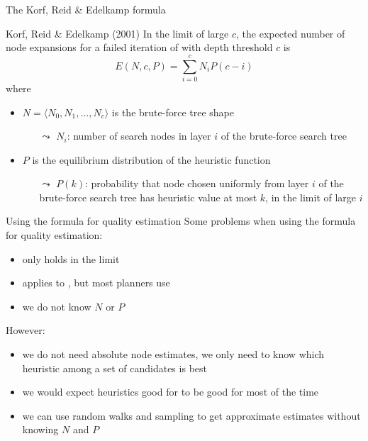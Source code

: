 \documentclass{gkibeamer}
\begin{document}
\begin{frame}{The Korf, Reid \& Edelkamp formula}
  \begin{block}{Korf, Reid \& Edelkamp (2001)}
    In the limit of large $c$, the expected number of node expansions
    for a failed iteration of {\idastar} with depth threshold $c$ is
    \[ E(N, c, P) = \sum_{i=0}^c N_i P(c - i) \]
    where
    \begin{itemize}
    \item $N = \langle N_0, N_1, \dots, N_c\rangle$ is the
      \alert{brute-force tree shape}
      \begin{itemize}
      \item[$\leadsto$] $N_i$: number of search nodes in layer $i$ of
        the brute-force search tree
      \end{itemize}
    \item $P$ is the \alert{equilibrium distribution} of the heuristic
      function
      \begin{itemize}
      \item[$\leadsto$] $P(k)$: probability that node chosen
        uniformly from layer $i$ of the brute-force search tree has
        heuristic value at most $k$, in the limit of large $i$
      \end{itemize}
    \end{itemize}
  \end{block}
\end{frame}

\begin{frame}{Using the formula for quality estimation}
  Some problems when using the formula for quality estimation:
  \begin{itemize}
  \item only holds in the limit
  \item applies to {\idastar}, but most planners use {\astar}
  \item we do not know $N$ or $P$
  \end{itemize}

  \bigskip

  However:
  \begin{itemize}
  \item we do not need \alert{absolute} node estimates, we only need
    to know which heuristic among a set of candidates is \alert{best}
  \item we would expect heuristics good for {\idastar} to be good for
    {\astar} most of the time
  \item we can use \alert{random walks} and \alert{sampling} to get
    approximate estimates without knowing $N$ and $P$
  \end{itemize}
\end{frame}
\end{document}
